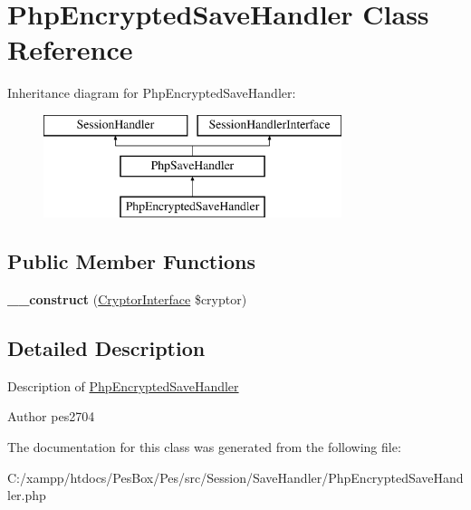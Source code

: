 \hypertarget{class_pes_1_1_session_1_1_save_handler_1_1_php_encrypted_save_handler}{}\section{Php\+Encrypted\+Save\+Handler Class Reference}
\label{class_pes_1_1_session_1_1_save_handler_1_1_php_encrypted_save_handler}
Inheritance diagram for Php\+Encrypted\+Save\+Handler\+:\begin{figure}[H]
\begin{center}
\leavevmode
\includegraphics[height=3.000000cm]{class_pes_1_1_session_1_1_save_handler_1_1_php_encrypted_save_handler}
\end{center}
\end{figure}
\subsection*{Public Member Functions}
\begin{DoxyCompactItemize}
\item 
\mbox{\label{class_pes_1_1_session_1_1_save_handler_1_1_php_encrypted_save_handler_acd7d64d36acc95abb63417e3e6df2138}} 
{\bfseries \+\_\+\+\_\+construct} (\mbox{\hyperlink{interface_pes_1_1_security_1_1_cryptor_1_1_cryptor_interface}{Cryptor\+Interface}} \$cryptor)
\end{DoxyCompactItemize}


\subsection{Detailed Description}
Description of \mbox{\hyperlink{class_pes_1_1_session_1_1_save_handler_1_1_php_encrypted_save_handler}{Php\+Encrypted\+Save\+Handler}}

\begin{DoxyAuthor}{Author}
pes2704 
\end{DoxyAuthor}


The documentation for this class was generated from the following file\+:\begin{DoxyCompactItemize}
\item 
C\+:/xampp/htdocs/\+Pes\+Box/\+Pes/src/\+Session/\+Save\+Handler/Php\+Encrypted\+Save\+Handler.\+php\end{DoxyCompactItemize}
